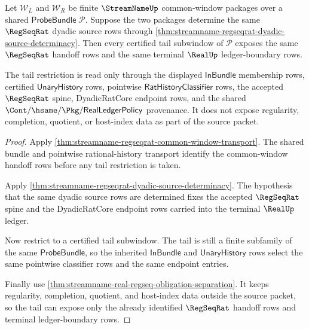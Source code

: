 \begin{theorem}
\label{thm:streamname-regseqrat-common-window-tail-stability}
Let $\mathcal W_L$ and $\mathcal W_R$ be finite $\StreamNameUp$ common-window
packages over a shared $\mathsf{ProbeBundle}$ $\mathcal P$. Suppose the two
packages determine the same $\RegSeqRat$ dyadic source rows through
\autoref{thm:streamname-regseqrat-dyadic-source-determinacy}. Then every
certified tail subwindow of $\mathcal P$ exposes the same $\RegSeqRat$ handoff
rows and the same terminal $\RealUp$ ledger-boundary rows.

The tail restriction is read only through the displayed
$\mathsf{InBundle}$ membership rows, certified $\mathsf{UnaryHistory}$ rows,
pointwise $\mathsf{RatHistoryClassifier}$ rows, the accepted $\RegSeqRat$
spine, DyadicRatCore endpoint rows, and the shared
$\Cont/\hsame/\Pkg/\mathsf{RealLedgerPolicy}$ provenance. It does not expose
regularity, completion, quotient, or host-index data as part of the source
packet.
\end{theorem}
\begin{proof}
Apply \autoref{thm:streamname-regseqrat-common-window-transport}. The shared
bundle and pointwise rational-history transport identify the common-window
handoff rows before any tail restriction is taken.

Apply \autoref{thm:streamname-regseqrat-dyadic-source-determinacy}. The
hypothesis that the same dyadic source rows are determined fixes the accepted
$\RegSeqRat$ spine and the DyadicRatCore endpoint rows carried into the
terminal $\RealUp$ ledger.

Now restrict to a certified tail subwindow. The tail is still a finite subfamily
of the same $\mathsf{ProbeBundle}$, so the inherited $\mathsf{InBundle}$ and
$\mathsf{UnaryHistory}$ rows select the same pointwise classifier rows and the
same endpoint entries.

Finally use \autoref{thm:streamname-real-regseq-obligation-separation}. It
keeps regularity, completion, quotient, and host-index data outside the source
packet, so the tail can expose only the already identified $\RegSeqRat$ handoff
rows and terminal ledger-boundary rows.
\end{proof}

